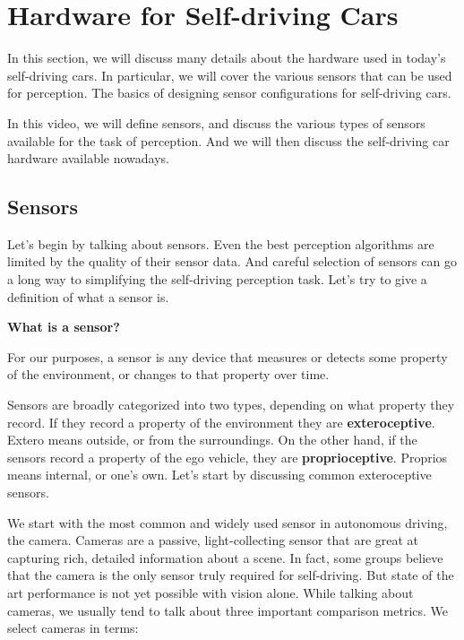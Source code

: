 \section{Hardware for Self-driving Cars}
\label{hardware_for_self_driving_cars}
In this section, we will  discuss many details about the hardware used in
today's self-driving cars. In particular, we will cover the various
sensors that can be used for perception. The basics of designing sensor
configurations for self-driving cars.

 In this video, we will define sensors, and discuss the various types of sensors
available for the task of perception. And we will then discuss the self-driving
car hardware available nowadays. 

\subsection{Sensors}
\label{sensors}

Let's begin by talking about sensors. Even the best perception algorithms
are limited by the quality of their sensor data. And careful selection of sensors
can go a long way to simplifying the self-driving perception task. Let's try to give a definition of
what a sensor is.


\begin{framed}
\theoremstyle{definition}
\begin{definition}{\textbf{What is a sensor? }}

For our purposes, a sensor is any device that measures or
detects some property of the environment, or changes to that property over time.
\end{definition}
\end{framed}


Sensors are broadly categorized into two types, depending on what property they record. If they record a property of
the environment they are {\textbf{exteroceptive}}. Extero means outside, or from the surroundings. On the other hand, if the sensors
record a property of the ego vehicle, they are {\textbf{proprioceptive}}. Proprios means internal, or one's own. Let's start by discussing
common exteroceptive sensors. 



We start with the most common and widely used sensor in autonomous driving, the camera. Cameras are a passive, light-collecting
sensor that are great at capturing rich, detailed information about a scene. In fact, some groups believe that the
camera is the only sensor truly required for self-driving. But state of the art performance is
not yet possible with vision alone. While talking about cameras, we usually tend to talk about three
important comparison metrics. We select cameras in terms:


